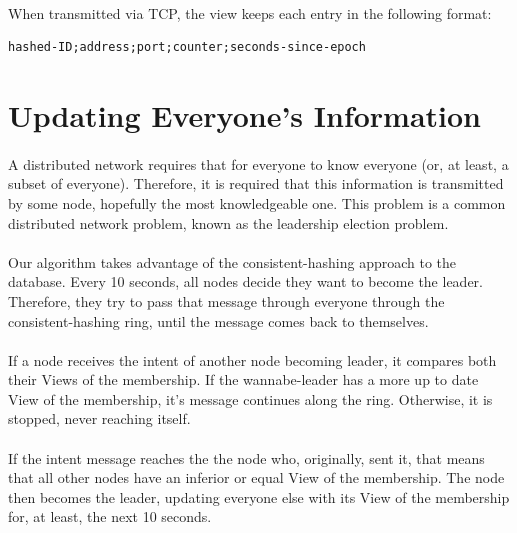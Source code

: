 \documentclass{report}
\begin{document}
        		\paragraph{}When transmitted via TCP, the view keeps each entry in the following format:
        		
        		\begin{adjustbox}{center}
        			\begin{lstlisting}
hashed-ID;address;port;counter;seconds-since-epoch
        			\end{lstlisting}
        		\end{adjustbox}
	        
	        \section{Updating Everyone's Information}
	        
	        	\paragraph{}A distributed network requires that for everyone to know everyone (or, at least, a subset of everyone). Therefore, it is required that this information is transmitted by some node, hopefully the most knowledgeable one. This problem is a common distributed network problem, known as the leadership election problem.
	        	
	        	\paragraph{}Our algorithm takes advantage of the consistent-hashing approach to the database. Every 10 seconds, all nodes decide they want to become the leader. Therefore, they try to pass that message through everyone through the consistent-hashing ring, until the message comes back to themselves.
	        	
	        	\paragraph{}If a node receives the intent of another node becoming leader, it compares both their Views of the membership. If the wannabe-leader has a more up to date View of the membership, it's message continues along the ring. Otherwise, it is stopped, never reaching itself.
	        	
	        	\paragraph{}If the intent message reaches the the node who, originally, sent it, that means that all other nodes have an inferior or equal View of the membership. The node then becomes the leader, updating everyone else with its View of the membership for, at least, the next 10 seconds.
	        	
\end{document}
